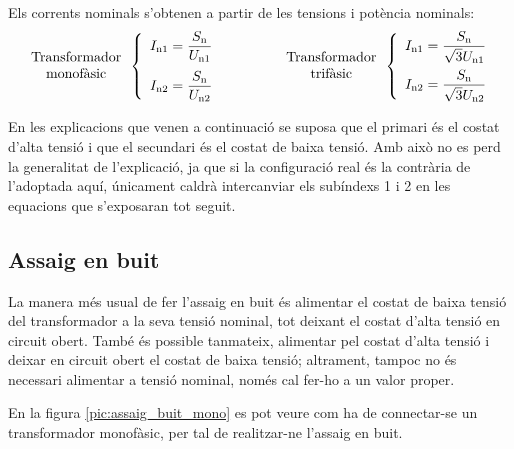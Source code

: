 Els corrents nominals s'obtenen a partir de les tensions i potència
nominals:
\begin{equation}
\begin{array}{c}\text{Transformador}\\
\text{monofàsic}
\end{array} \left\{
\begin{array}{l}
   I_\mathrm{n1} = \dfrac{S_\mathrm{n}}{U_\mathrm{n1}} \\[2.7ex]
   I_\mathrm{n2} = \dfrac{S_\mathrm{n}}{U_\mathrm{n2}}
\end{array}
\right. \qquad\qquad
\begin{array}{c}\text{Transformador}\\
\text{trifàsic}
\end{array} \left\{
\begin{array}{l}
   I_\mathrm{n1} = \dfrac{S_\mathrm{n}}{\sqrt{3}U_\mathrm{n1}} \\[2.5ex]
   I_\mathrm{n2} = \dfrac{S_\mathrm{n}}{\sqrt{3}U_\mathrm{n2}}
\end{array}
\right.
\end{equation}

En les explicacions que venen a continuació se suposa que el
primari és el costat d'alta tensió i que el secundari és el costat
de baixa tensió. Amb això no es perd la generalitat de
l'explicació, ja que si la configuració real és la contrària de l'adoptada aquí, únicament caldrà intercanviar els subíndexs 1 i 2 en
les equacions que s'exposaran tot seguit.

\subsection{Assaig en buit}

La manera més usual de fer l'assaig en buit és alimentar el costat
de baixa tensió del transformador a  la seva tensió nominal, tot
deixant el costat d'alta tensió en circuit obert. També és possible
tanmateix, alimentar pel costat d'alta tensió i deixar en circuit
obert el costat de baixa tensió; altrament, tampoc no és necessari
alimentar a tensió nominal, només cal fer-ho a un valor proper.

En la figura \vref{pic:assaig_buit_mono} es pot veure com ha de
connectar-se un transformador monofàsic, per tal de realitzar-ne
l'assaig en buit.

\begin{center}
    
    \label{pic:assaig_buit_mono}
\end{center}

